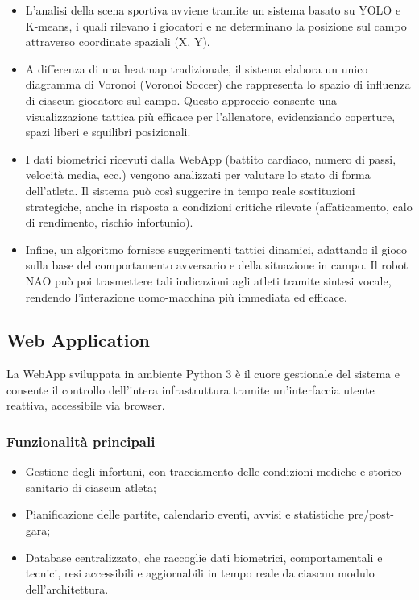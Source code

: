 \documentclass{optica-article}
\begin{document}
\begin{itemize}
  \item L’analisi della scena sportiva avviene tramite un sistema basato su YOLO e K-means, i quali rilevano i giocatori e ne determinano la posizione sul campo attraverso coordinate spaziali (X, Y). 
  
  \item A differenza di una heatmap tradizionale, il sistema elabora un unico diagramma di Voronoi (Voronoi Soccer) che rappresenta lo spazio di influenza di ciascun giocatore sul campo. Questo approccio consente una visualizzazione tattica più efficace per l'allenatore, evidenziando coperture, spazi liberi e squilibri posizionali.
  
  \item I dati biometrici ricevuti dalla WebApp (battito cardiaco, numero di passi, velocità media, ecc.) vengono analizzati per valutare lo stato di forma dell’atleta. Il sistema può così suggerire in tempo reale sostituzioni strategiche, anche in risposta a condizioni critiche rilevate (affaticamento, calo di rendimento, rischio infortunio).
  
  \item Infine, un algoritmo fornisce suggerimenti tattici dinamici, adattando il gioco sulla base del comportamento avversario e della situazione in campo. Il robot NAO può poi trasmettere tali indicazioni agli atleti tramite sintesi vocale, rendendo l’interazione uomo-macchina più immediata ed efficace.
\end{itemize}

\subsection{Web Application}
La WebApp sviluppata in ambiente Python 3 è il cuore gestionale del sistema e consente il controllo dell’intera infrastruttura tramite un’interfaccia utente reattiva, accessibile via browser.

\subsubsection*{Funzionalità principali}
\begin{itemize}
  \item Gestione degli infortuni, con tracciamento delle condizioni mediche e storico sanitario di ciascun atleta;
  \item Pianificazione delle partite, calendario eventi, avvisi e statistiche pre/post-gara;
  \item Database centralizzato, che raccoglie dati biometrici, comportamentali e tecnici, resi accessibili e aggiornabili in tempo reale da ciascun modulo dell’architettura.
\end{itemize}
\end{document}
